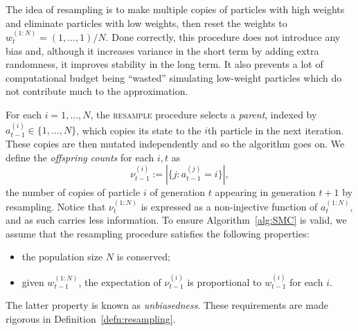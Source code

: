 The idea of resampling is to make multiple copies of particles with high weights and eliminate particles with low weights, then reset the weights to $w_t^{(1:N)} = (1,\dots,1)/N$. Done correctly, this procedure does not introduce any bias and, although it increases variance in the short term by adding extra randomness, it improves stability in the long term.
It also prevents a lot of computational budget being ``wasted'' simulating low-weight particles which do not contribute much to the approximation.

For each $i=1,\dots,N$, the \textsc{resample} procedure selects a \emph{parent}, indexed by $a_{t-1}^{(i)} \in \{1,\dots,N\}$, which copies its state to the $i$th particle in the next iteration. These copies are then mutated independently and so the algorithm goes on.
We define the \emph{offspring counts} for each $i,t$ as
\begin{equation*}
\nu_{t-1}^{(i)} := |\{ j: a_{t-1}^{(j)} = i \}| ,
\end{equation*}
the number of copies of particle $i$ of generation $t$ appearing in generation $t+1$ by resampling. Notice that $\nu_t^{(1:N)}$ is expressed as a non-injective function of $a_t^{(1:N)}$, and as such carries less information.
To ensure Algorithm~\ref{alg:SMC} is valid, we assume that the resampling procedure satisfies the following properties:
\begin{itemize}
\item the population size $N$ is conserved;
\item given $w_{t-1}^{(1:N)}$, the expectation of $\nu_{t-1}^{(i)}$ is proportional to $w_{t-1}^{(i)}$ for each $i$.
\end{itemize}
The latter property is known as \emph{unbiasedness}.
These requirements are made rigorous in Definition~\ref{defn:resampling}.

